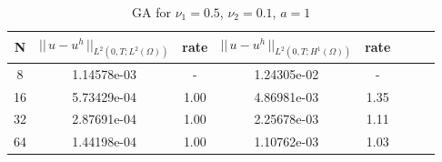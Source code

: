 \documentclass[10pt]{article}%
\numberwithin{equation}{section}
\begin{document}
\begin{table}[!ht]
	\caption{GA for $\nu_1 = 0.5$, $\nu_2 = 0.1$, $a = 1$}
	\begin{center} \label{table:GA}
		\begin{tabular}{|c|c|c|c|c|c|c|c|}
			\hline N  & $||\,u-u^h\,||_{L^2(0,T;L^2(\Omega))}$ & rate & $||\,u-u^h\,||_{L^2(0,T;H^1(\Omega))}$ & rate\\
			\hline 8  & 1.14578e-03 & -    & 1.24305e-02 & -    \\
			\hline 16 & 5.73429e-04 & 1.00 & 4.86981e-03 & 1.35 \\
			\hline 32 & 2.87691e-04 & 1.00 & 2.25678e-03 & 1.11 \\
			\hline 64 & 1.44198e-04 & 1.00 & 1.10762e-03 & 1.03 \\
			\hline
		\end{tabular}
	\end{center}
\end{table}
\end{document}
